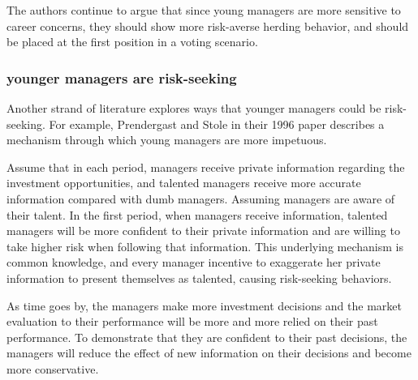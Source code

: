 \documentclass{article}
\begin{document}
\begin{CJK}{UTF8}{gbsn}
The authors continue to argue that since young managers are more sensitive to career concerns, they should show more risk-averse herding behavior, and should be placed at the first position in a voting scenario. 



\subsubsection{younger managers are risk-seeking}
Another strand of literature explores ways that younger managers could be risk-seeking. For example, Prendergast and Stole in their 1996 paper\cite{impetuous} describes a mechanism through which young managers are more impetuous. 

Assume that in each period, managers receive private information regarding the investment opportunities, and talented managers receive more accurate information compared with dumb managers. Assuming managers are aware of their talent. In the first period, when managers receive information, talented managers will be more confident to their private information and are willing to take higher risk when following that information. This underlying mechanism is common knowledge, and every manager incentive to exaggerate her private information to present themselves as talented, causing risk-seeking behaviors. 

As time goes by, the managers make more investment decisions and the market evaluation to their performance will be more and more relied on their past performance. To demonstrate that they are confident to their past decisions, the managers will reduce the effect of new information on their decisions and become more conservative. 


\end{CJK}
\end{document}
